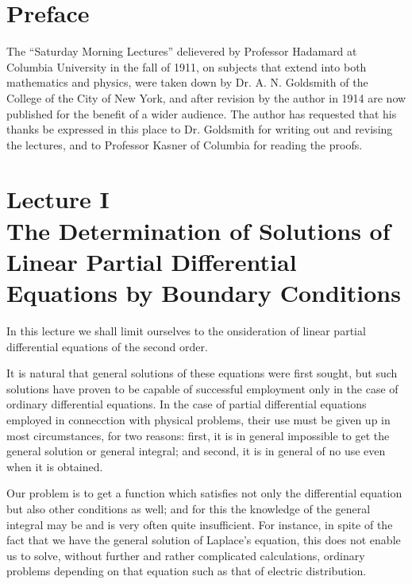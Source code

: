 \documentclass[12pt,oneside]{book}
\begin{document}
\pagebreak
\chapter{Preface}
\noindent The ``Saturday Morning Lectures'' delievered by Professor Hadamard at Columbia University
in the fall of 1911, on subjects that extend into both mathematics and physics, were taken down
by Dr. A. N. Goldsmith of the College of the City of New York, and after revision by the author in 1914
are now published for the benefit of a wider audience. The author has requested that his thanks be expressed
in this place to Dr. Goldsmith for writing out and revising the lectures, and to Professor Kasner of Columbia
for reading the proofs. \par

\tableofcontents

\mainmatter

\chapter[Lecture I]{Lecture I\\
The Determination of Solutions of Linear Partial Differential Equations by Boundary Conditions}
\vspace*{-\baselineskip}
In this lecture we shall limit ourselves to the onsideration of linear partial differential equations
of the second order. \par

It is natural that general solutions of these equations were first sought, but such solutions have
proven to be capable of successful employment only in the case of ordinary differential equations.
In the case of partial differential equations employed in connecction with physical problems,
their use must be given up in most circumstances, for two reasons: first, it is in general impossible
to get the general solution or general integral; and second, it is in general of no use even when it
is obtained. \par

Our problem is to get a function which satisfies not only the differential equation but also other
conditions as well; and for this the knowledge of the general integral may be and is very often
quite insufficient. For instance, in spite of the fact that we have the general solution of Laplace's
equation, this does not enable us to solve, without further and rather complicated calculations,
ordinary problems depending on that equation such as that of electric distribution. \par
\end{document}
